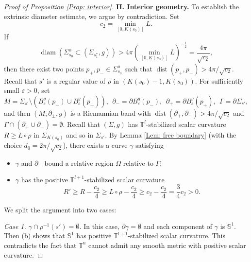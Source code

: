 \documentclass[11pt, reqno]{amsart}
\numberwithin{equation}{section}
\theoremstyle{definition}
\DeclareMathOperator{\dist}{dist}
\DeclareMathOperator{\diam}{diam}
\newcommand{\ve}{\varepsilon}
\newcommand{\de}{\partial}
\begin{document}
\begin{proof}[Proof of Proposition \ref{Prop: interior}]
\bigskip
\noindent
{\bf II. Interior geometry.}
To establish the extrinsic diameter estimate, we argue by contradiction. Set
\[
c_2=\min_{[0,K(s_{0})]}L.
\]
If
\[
\diam(\Sigma_{s_0}^{o} \subset (\Sigma_{s_1^*},g)) > 4\pi \left(\min_{[0,K(s_{0})]}L\right)^{-\frac{1}{2}} = \frac{4\pi}{\sqrt{c_{2}}},
\]
then there exist two points $p_{+},p_{-}\in\Sigma_{s_0}^{o}$ such that $\dist(p_{+},p_{-})>4\pi/\sqrt{c_{2}}$. Recall that $s'$ is a regular value of $\rho$ in $(K(s_{0})-1,K(s_{0}))$. For sufficiently small $\ve>0$, set
\[
M = \Sigma_{s'}\setminus(B_{\ve}^{g}(p_{-})\cup B_{\ve}^{g}(p_{+})), \ \
\de_{-} = \de B_{\ve}^{g}(p_{-}), \ \
\de_{+} = \de B_{\ve}^{g}(p_{+}), \ \
\Gamma = \de\Sigma_{s'},
\]
and then $(M,\de_{\pm},g)$ is a Riemannian band with $\dist(\partial_+,\partial_-)>4\pi/\sqrt{c_{2}}$ and $\Gamma\cap(\de_{+}\cup\de_{-})=\emptyset$. Recall that $(\Sigma,g)$ has $\mathbb{T}^l$-stabilized scalar curvature $R\geq L\circ \rho$ in $\Sigma_{K(s_0)}$ and so in $\Sigma_{s'}$.
By Lemma \ref{Lem: free boundary} (with the choice $d_{0}=2\pi/\sqrt{c_{2}}$), there exists a curve $\gamma$ satisfying
\begin{itemize}\setlength{\itemsep}{1mm}
\item[(a)] $\gamma$ and $\partial_-$ bound a relative region $\Omega$ relative to $\Gamma$;
\item[(b)] $\gamma$ has the positive $\mathbb T^{l+1}$-stabilized scalar curvature
\[
R' \geq R-\frac{c_{2}}{4} \geq L\circ \rho-\frac{c_{2}}{4} \geq c_{2}-\frac{c_{2}}{4} = \frac{3}{4}c_{2} > 0.
\]
\end{itemize}
We split the argument into two cases:

\medskip

{\it Case 1. $\gamma\cap\rho^{-1}(s')=\emptyset$.} In this case, $\de\gamma=\emptyset$ and each component of $\gamma$ is $\mathbb{S}^{1}$. Then (b) shows that $\mathbb{S}^{1}$ has positive $\mathbb T^{l+1}$-stabilized scalar curvature. This contradicts the fact that $\mathbb{T}^{n}$ cannot admit any smooth metric with positive scalar curvature.

\medskip


\end{proof}
\end{document}
